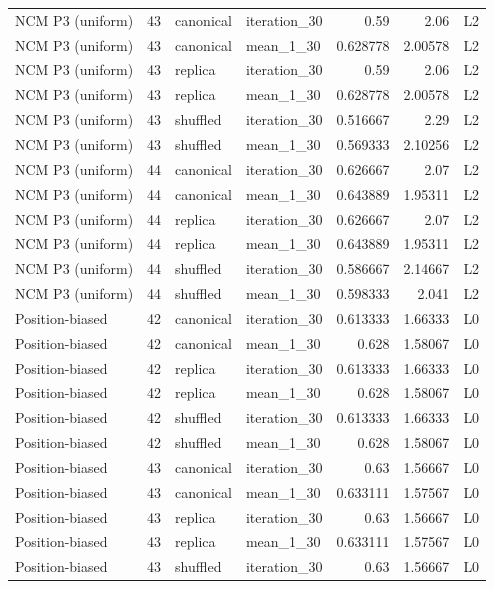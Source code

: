 \begin{table}[htbp!]
\begin{tabular}{lrllrrl}
NCM P3 (uniform) & 43 & canonical & iteration\_30 & 0.59 & 2.06 & L2 \\
NCM P3 (uniform) & 43 & canonical & mean\_1\_30 & 0.628778 & 2.00578 & L2 \\
NCM P3 (uniform) & 43 & replica & iteration\_30 & 0.59 & 2.06 & L2 \\
NCM P3 (uniform) & 43 & replica & mean\_1\_30 & 0.628778 & 2.00578 & L2 \\
NCM P3 (uniform) & 43 & shuffled & iteration\_30 & 0.516667 & 2.29 & L2 \\
NCM P3 (uniform) & 43 & shuffled & mean\_1\_30 & 0.569333 & 2.10256 & L2 \\
NCM P3 (uniform) & 44 & canonical & iteration\_30 & 0.626667 & 2.07 & L2 \\
NCM P3 (uniform) & 44 & canonical & mean\_1\_30 & 0.643889 & 1.95311 & L2 \\
NCM P3 (uniform) & 44 & replica & iteration\_30 & 0.626667 & 2.07 & L2 \\
NCM P3 (uniform) & 44 & replica & mean\_1\_30 & 0.643889 & 1.95311 & L2 \\
NCM P3 (uniform) & 44 & shuffled & iteration\_30 & 0.586667 & 2.14667 & L2 \\
NCM P3 (uniform) & 44 & shuffled & mean\_1\_30 & 0.598333 & 2.041 & L2 \\
Position-biased & 42 & canonical & iteration\_30 & 0.613333 & 1.66333 & L0 \\
Position-biased & 42 & canonical & mean\_1\_30 & 0.628 & 1.58067 & L0 \\
Position-biased & 42 & replica & iteration\_30 & 0.613333 & 1.66333 & L0 \\
Position-biased & 42 & replica & mean\_1\_30 & 0.628 & 1.58067 & L0 \\
Position-biased & 42 & shuffled & iteration\_30 & 0.613333 & 1.66333 & L0 \\
Position-biased & 42 & shuffled & mean\_1\_30 & 0.628 & 1.58067 & L0 \\
Position-biased & 43 & canonical & iteration\_30 & 0.63 & 1.56667 & L0 \\
Position-biased & 43 & canonical & mean\_1\_30 & 0.633111 & 1.57567 & L0 \\
Position-biased & 43 & replica & iteration\_30 & 0.63 & 1.56667 & L0 \\
Position-biased & 43 & replica & mean\_1\_30 & 0.633111 & 1.57567 & L0 \\
Position-biased & 43 & shuffled & iteration\_30 & 0.63 & 1.56667 & L0 \\

\end{tabular}
\end{table}
